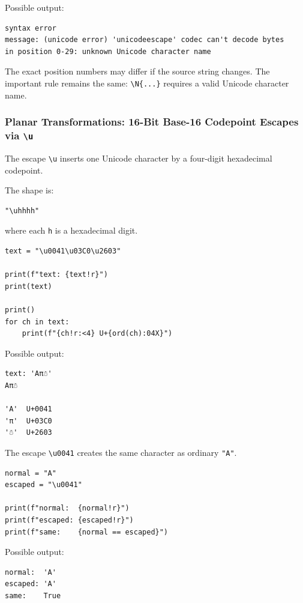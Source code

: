 Possible output:

\begin{verbatim}
syntax error
message: (unicode error) 'unicodeescape' codec can't decode bytes
in position 0-29: unknown Unicode character name
\end{verbatim}

The exact position numbers may differ if the source string changes. The important rule remains the same: \texttt{\textbackslash N\{...\}} requires a valid Unicode character name.

\subsubsection{Planar Transformations: 16-Bit Base-16 Codepoint Escapes via \texttt{\textbackslash u}}

The escape \texttt{\textbackslash u} inserts one Unicode character by a four-digit hexadecimal codepoint.

The shape is:

\begin{verbatim}
"\uhhhh"
\end{verbatim}

where each \texttt{h} is a hexadecimal digit.

\begin{verbatim}
text = "\u0041\u03C0\u2603"

print(f"text: {text!r}")
print(text)

print()
for ch in text:
    print(f"{ch!r:<4} U+{ord(ch):04X}")
\end{verbatim}

Possible output:

\begin{verbatim}
text: 'Aπ☃'
Aπ☃

'A'  U+0041
'π'  U+03C0
'☃'  U+2603
\end{verbatim}

The escape \texttt{\textbackslash u0041} creates the same character as ordinary \texttt{"A"}.

\begin{verbatim}
normal = "A"
escaped = "\u0041"

print(f"normal:  {normal!r}")
print(f"escaped: {escaped!r}")
print(f"same:    {normal == escaped}")
\end{verbatim}

Possible output:

\begin{verbatim}
normal:  'A'
escaped: 'A'
same:    True
\end{verbatim}

